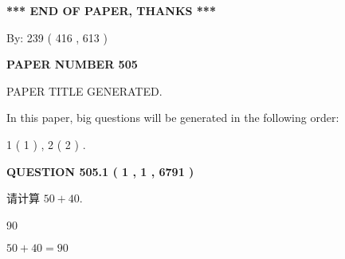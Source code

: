 \documentclass{ctexart}
\begin{document}
   
   
   
\vspace{1.0in} 
{\textbf{\large{ *** END OF PAPER, THANKS *** }}} 
   
   
\hspace{1.0in} By: 
 239 ( 416 ,  613 )
   
   
   
   
\newpage 
\setcounter{page}{ 
   505001 } 
   
   
   
   
 {\textbf{ \Large{ PAPER NUMBER  505  }}}
   
   
\vspace{0.2in}
   
   
   
   
   
   
   
   
 \vspace{0.2in}
 
 
 
 
   
   
 PAPER TITLE GENERATED.
   
   
   
\vspace{0.2in}
   
In this paper, big questions will be generated in the following order: 
   
   
   1 ( 1 )
 ,
   2 ( 2 )
 .
  
\vspace{0.2in}
  
{\textbf{\Large{QUESTION
505.1 
 ( 1 , 1 , 6791 )
}}}
  
  
 
请计算 $ %
50 +  %
40 $.
 
 
 
\noindent{}
 
 

90
 
 
\noindent{}
 
 

 
 
 
\noindent{}
 
 

$ %
50 +  %
40=   %
90$
 
\end{document}
